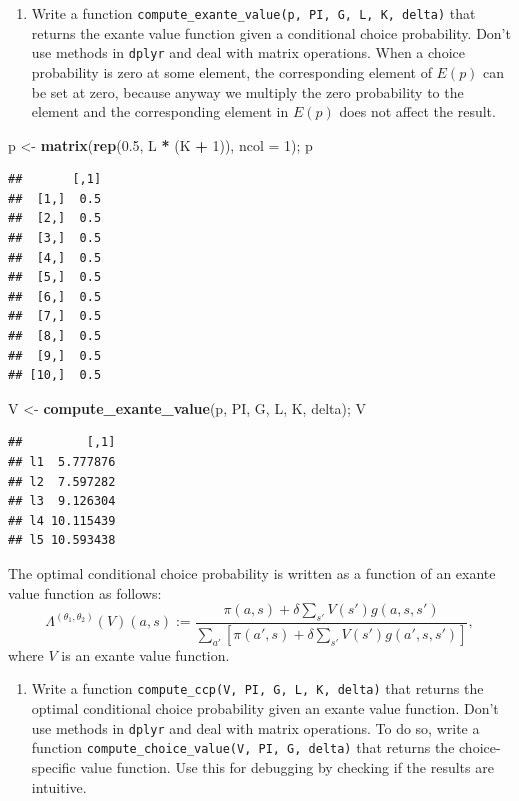\documentclass[]{book}
\newenvironment{Shaded}{\begin{snugshade}}{\end{snugshade}}
\newcommand{\KeywordTok}[1]{\textcolor[rgb]{0.13,0.29,0.53}{\textbf{#1}}}
\newcommand{\DataTypeTok}[1]{\textcolor[rgb]{0.13,0.29,0.53}{#1}}
\newcommand{\DecValTok}[1]{\textcolor[rgb]{0.00,0.00,0.81}{#1}}
\newcommand{\FloatTok}[1]{\textcolor[rgb]{0.00,0.00,0.81}{#1}}
\newcommand{\StringTok}[1]{\textcolor[rgb]{0.31,0.60,0.02}{#1}}
\newcommand{\OperatorTok}[1]{\textcolor[rgb]{0.81,0.36,0.00}{\textbf{#1}}}
\newcommand{\NormalTok}[1]{#1}
\providecommand{\tightlist}{%
  \setlength{\itemsep}{0pt}\setlength{\parskip}{0pt}}
\begin{document}
\begin{enumerate}
\def\labelenumi{\arabic{enumi}.}
\setcounter{enumi}{2}
\tightlist
\item
  Write a function
  \texttt{compute\_exante\_value(p,\ PI,\ G,\ L,\ K,\ delta)} that
  returns the exante value function given a conditional choice
  probability. Don't use methods in \texttt{dplyr} and deal with matrix
  operations. When a choice probability is zero at some element, the
  corresponding element of \(E(p)\) can be set at zero, because anyway
  we multiply the zero probability to the element and the corresponding
  element in \(E(p)\) does not affect the result.
\end{enumerate}

\begin{Shaded}
\begin{Highlighting}[]
\NormalTok{p <-}\StringTok{ }\KeywordTok{matrix}\NormalTok{(}\KeywordTok{rep}\NormalTok{(}\FloatTok{0.5}\NormalTok{, L }\OperatorTok{*}\StringTok{ }\NormalTok{(K }\OperatorTok{+}\StringTok{ }\DecValTok{1}\NormalTok{)), }\DataTypeTok{ncol =} \DecValTok{1}\NormalTok{); p}
\end{Highlighting}
\end{Shaded}

\begin{verbatim}
##       [,1]
##  [1,]  0.5
##  [2,]  0.5
##  [3,]  0.5
##  [4,]  0.5
##  [5,]  0.5
##  [6,]  0.5
##  [7,]  0.5
##  [8,]  0.5
##  [9,]  0.5
## [10,]  0.5
\end{verbatim}

\begin{Shaded}
\begin{Highlighting}[]
\NormalTok{V <-}\StringTok{ }\KeywordTok{compute_exante_value}\NormalTok{(p, PI, G, L, K, delta); V}
\end{Highlighting}
\end{Shaded}

\begin{verbatim}
##         [,1]
## l1  5.777876
## l2  7.597282
## l3  9.126304
## l4 10.115439
## l5 10.593438
\end{verbatim}

The optimal conditional choice probability is written as a function of
an exante value function as follows: \[
\Lambda^{(\theta_1, \theta_2)}(V)(a, s) := \frac{\pi(a, s) + \delta \sum_{s'}V(s')g(a, s, s')}{\sum_{a'}[\pi(a', s) + \delta \sum_{s'}V(s')g(a', s, s')]},
\] where \(V\) is an exante value function.

\begin{enumerate}
\def\labelenumi{\arabic{enumi}.}
\setcounter{enumi}{3}
\tightlist
\item
  Write a function \texttt{compute\_ccp(V,\ PI,\ G,\ L,\ K,\ delta)}
  that returns the optimal conditional choice probability given an
  exante value function. Don't use methods in \texttt{dplyr} and deal
  with matrix operations. To do so, write a function
  \texttt{compute\_choice\_value(V,\ PI,\ G,\ delta)} that returns the
  choice-specific value function. Use this for debugging by checking if
  the results are intuitive.
\end{enumerate}
\end{document}
